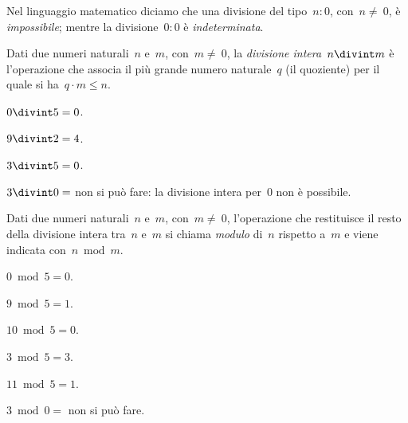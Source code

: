 Nel linguaggio matematico diciamo che una divisione del tipo~$n:0$, con~$n\neq~0$, è \emph{impossibile}; mentre la
divisione~$0:0$ è \emph{indeterminata}.

\begin{definizione}
 Dati due numeri naturali~$n$ e~$m$, con~$m\neq~0$, la \emph{divisione intera}~$n\divint m$ è l'operazione
che associa il più grande numero naturale~$q$ (il quoziente) per il quale si ha~$q\cdot m\le n$.
\end{definizione}

\begin{exrig}
 \begin{esempio}
$0 \divint 5=0$.
 \end{esempio}

 \begin{esempio}
$9 \divint 2=4$.
 \end{esempio}

 \begin{esempio}
$3\divint 5=0$.
 \end{esempio}

 \begin{esempio}
$3\divint 0 = $ non si può fare: la divisione intera per~0 non è possibile. 
 \end{esempio}
\end{exrig}

\begin{definizione}
 Dati due numeri naturali~$n$ e~$m$, con~$m\neq~0$, l'operazione che restituisce il resto della
divisione intera tra~$n$ e~$m$ si chiama \emph{modulo} di~$n$ rispetto a~$m$ e viene indicata con~$n\bmod{m}$.
\end{definizione}

\begin{exrig}
 \begin{esempio}
$0\bmod 5=0$.
 \end{esempio}

 \begin{esempio}
$9\bmod 5 =1$.
 \end{esempio}

 \begin{esempio}
$10\bmod 5=0$.
 \end{esempio}

 \begin{esempio}
$3\bmod 5=3$.
 \end{esempio}

 \begin{esempio}
$11\bmod 5=1$.
 \end{esempio}

 \begin{esempio}
$3\bmod 0=$ non si può fare.
 \end{esempio}
\end{exrig}

